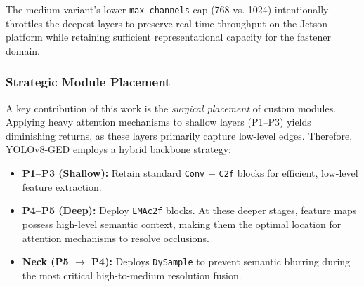 The medium variant's lower \texttt{max\_channels} cap (768 vs. 1024) intentionally throttles the deepest layers to preserve real-time throughput on the Jetson platform while retaining sufficient representational capacity for the fastener domain.

\subsubsection{Strategic Module Placement}

A key contribution of this work is the \textit{surgical placement} of custom modules. Applying heavy attention mechanisms to shallow layers (P1--P3) yields diminishing returns, as these layers primarily capture low-level edges. Therefore, YOLOv8-GED employs a hybrid backbone strategy:

\begin{itemize}
    \item \textbf{P1--P3 (Shallow):} Retain standard \texttt{Conv} + \texttt{C2f} blocks for efficient, low-level feature extraction.
    
    \item \textbf{P4--P5 (Deep):} Deploy \texttt{EMAc2f} blocks. At these deeper stages, feature maps possess high-level semantic context, making them the optimal location for attention mechanisms to resolve occlusions.
    
    \item \textbf{Neck (P5 $\rightarrow$ P4):} Deploys \texttt{DySample} to prevent semantic blurring during the most critical high-to-medium resolution fusion.
\end{itemize}


